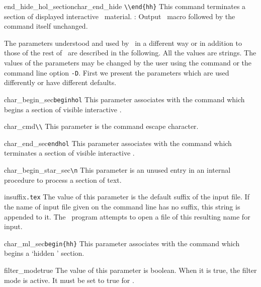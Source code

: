 \begin{describecmd}{end_hide_hol_section}{char_end_hide}{\none}
{\verb|\\end{hh}|}
\describe
This command terminates a section of displayed interactive \HOL\ material.
\winnowaction: Output \mweb\ macro
  followed by the command itself unchanged.
\end{describecmd}
\vspace*{8pt}

The parameters understood and used by \winnow\ in a different way or
in addition to those of the rest of \mweb\ are described in the
following.  All the values are strings.  The values of the parameters
may be changed by the user using the  command or the
command line option {\tt -D}.
First we present the parameters which
are used differently or have different defaults.

\noindent\cmdrule

\begin{describepara}{char_begin_sec}{\verb|beginhol|}\describe
This parameter associates with the  command
which begins a section of visible interactive \HOL. 
\end{describepara}
\begin{describepara}{char_cmd}{\verb|\\|}\describe
This parameter is the command escape character.
\end{describepara}
\begin{describepara}{char_end_sec}{\verb|endhol|}\describe
This parameter associates with the  command
which terminates a section of visible interactive \HOL. 
\end{describepara}
\begin{describepara}{char_begin_star_sec}{\verb|\n|}\describe
This parameter is an unused entry in an internal procedure to process
a section of text.
\end{describepara}
\begin{describepara}{insuffix}{\verb*|.tex|}\describe
The value of this parameter is the default suffix of the input file.
If the name of input file given on the command line has no suffix,
this string is appended to it. The \winnow\ program attempts to open a
file of this resulting name for input.
\end{describepara}
\begin{describepara}{char_ml_sec}{\verb|begin{hh}|}\describe
This parameter associates with the  command
which begins a `hidden \HOL' section. 
\end{describepara}
\begin{describepara}{filter_mode}{true}\describe
The value of this parameter is boolean. When it is true, the filter
mode is active.  It must be set to true for \winnow.
\end{describepara}

